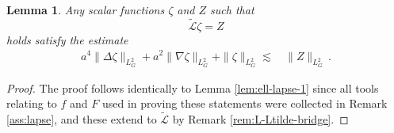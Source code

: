 \documentclass[11pt,leqno,textwidth=10cm]{amsart}
\numberwithin{equation}{section}
\theoremstyle{definition}
\theoremstyle{plain}
\newtheorem{lemma}[definition]{Lemma}
\newcommand{\1}{\mathbbm{1}}
\renewcommand{\L}{\mathcal{L}}
\newcommand{\Lap}{\Delta}
\newcommand{\Ltilde}{\tilde{\L}}
\begin{document}
\begin{lemma}\label{lem:ell-lapse-Ltilde}
Any scalar functions $\zeta$ and $Z$ such that
\[\Ltilde \zeta=Z\]
holds satisfy the estimate
\begin{align*}
a^4\|\Lap\zeta\|_{L^2_G}+a^2\|\nabla \zeta\|_{L^2_G}+\|\zeta\|_{L^2_G}\lesssim&\,\|Z\|_{L^2_G}\,.%
\end{align*}
\end{lemma}
\begin{proof}
The proof follows identically to Lemma \ref{lem:ell-lapse-1} %
 since all tools relating to $f$ and $F$ used in proving these statements were collected in Remark \ref{ass:lapse}, and these extend to $\Ltilde$ by Remark \ref{rem:L-Ltilde-bridge}.
\end{proof}
\end{document}
